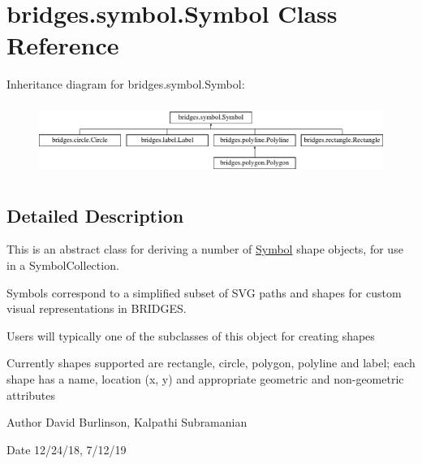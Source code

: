 \hypertarget{classbridges_1_1symbol_1_1_symbol}{}\section{bridges.\+symbol.\+Symbol Class Reference}
\label{classbridges_1_1symbol_1_1_symbol}
Inheritance diagram for bridges.\+symbol.\+Symbol\+:\begin{figure}[H]
\begin{center}
\leavevmode
\includegraphics[height=2.346369cm]{classbridges_1_1symbol_1_1_symbol}
\end{center}
\end{figure}


\subsection{Detailed Description}
This is an abstract class for deriving a number of \mbox{\hyperlink{classbridges_1_1symbol_1_1_symbol}{Symbol}} shape objects, for use in a Symbol\+Collection. 

Symbols correspond to a simplified subset of S\+VG paths and shapes for custom visual representations in B\+R\+I\+D\+G\+ES.

Users will typically one of the subclasses of this object for creating shapes

Currently shapes supported are rectangle, circle, polygon, polyline and label; each shape has a name, location (x, y) and appropriate geometric and non-\/geometric attributes

\begin{DoxyAuthor}{Author}
David Burlinson, Kalpathi Subramanian 
\end{DoxyAuthor}
\begin{DoxyDate}{Date}
12/24/18, 7/12/19 
\end{DoxyDate}
